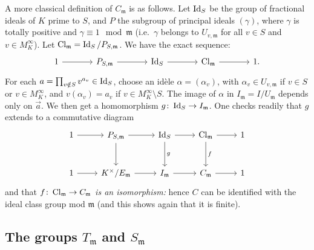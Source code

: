 \begin{obs}
A more classical definition of $C_{\mathfrak{m}}$ is as follows. Let $\operatorname{Id}_S$ be
the group of fractional ideals of $K$ prime to $S$, and $P$ the subgroup of
principal ideals $(\gamma)$, where $\gamma$ is totally positive and
\dpage
$\gamma \equiv 1 \mod{\mathfrak{m}}$ (i.e.\ $\gamma$ belongs to $U_{v,
\mathfrak{m}}$ for all $v \in S$ and $v \in M_K^\infty$). Let
$\operatorname{Cl}_{\mathfrak{m}} = \operatorname{Id}_S/P_{S, \mathfrak{m}}$. We have the exact sequence:
\[\begin{tikzcd}[sep=large]
	1 \rar & P_{S, \mathfrak{m}} \rar & \Id_S \rar & \Cl_{\mathfrak{m}}
	\rar & 1.
\end{tikzcd}\]
For each \vec $a = \prod_{v\notin S} v^{a_v} \in \operatorname{Id}_S$, choose an idèle
$\alpha = (\alpha_v)$, with $\alpha_v \in U_{v, \mathfrak{m}}$ if $v \in S$ or
$v \in M_K^\infty$, and $v(\alpha_v) = a_v$ if $v \in M_K^\infty \setminus S$.
The image of $\alpha$ in $I_{\mathfrak{m}} = I/U_{\mathfrak{m}}$ depends only
on $\vec a$. We then get a homomorphism $g \colon \operatorname{Id}_S \to I_{\mathfrak{m}}$.
One checks readily that $g$ extends to a commutative diagram
\[\begin{tikzcd}[row sep=large]
	1 & P_{S, \mathfrak{m}} & \Id_S & \Cl_{\mathfrak{m}} & 1 \\
	1 & K^\times/E_{\mathfrak{m}} & I_{\mathfrak{m}} & C_{\mathfrak{m}} & 1
	\arrow[from=1-1, to=1-2]
	\arrow[from=1-2, to=1-3]
	\arrow[from=1-2, to=2-2]
	\arrow[from=1-3, to=1-4]
	\arrow["g", from=1-3, to=2-3]
	\arrow[from=1-4, to=1-5]
	\arrow["f", from=1-4, to=2-4]
	\arrow[from=2-1, to=2-2]
	\arrow[from=2-2, to=2-3]
	\arrow[from=2-3, to=2-4]
	\arrow[from=2-4, to=2-5]
\end{tikzcd}\]
and that $f\colon \operatorname{Cl}_{\mathfrak{m}} \to C_{\mathfrak{m}}$ \emph{is an
isomorphism:} hence $C$ can be identified with the ideal class group mod
$\mathfrak{m}$ (and this shows again that it is finite).
\end{obs}

\subsection{The groups \texorpdfstring{$T_{\mathfrak{m}}$}{Tm} and
\texorpdfstring{$S_{\mathfrak{m}}$}{Sm}}
\label{sec:II_22}

